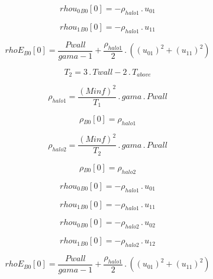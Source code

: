 \documentclass{article}
\begin{document}
\begin{dmath}{rhou_{0}{_{B0}}}[{0}] = - \rho_{halo 1} \,.\, u_{01}\end{dmath}

\begin{dmath}{rhou_{1}{_{B0}}}[{0}] = - \rho_{halo 1} \,.\, u_{11}\end{dmath}

\begin{dmath}{rhoE{_{B0}}}[{0}] = \frac{Pwall}{gama - 1} + \frac{\rho_{halo 1}}{2} \,.\, \left(\left(u_{01} \right)^{2} + \left(u_{11} \right)^{2}\right)\end{dmath}

\begin{dmath}T_{2} = 3 \,.\, Twall - 2 \,.\, T_{above}\end{dmath}

\begin{dmath}\rho_{halo 1} = \frac{\left(Minf \right)^{2}}{T_{1}} \,.\, gama \,.\, Pwall\end{dmath}

\begin{dmath}{\rho{_{B0}}}[{0}] = \rho_{halo 1}\end{dmath}

\begin{dmath}\rho_{halo 2} = \frac{\left(Minf \right)^{2}}{T_{2}} \,.\, gama \,.\, Pwall\end{dmath}

\begin{dmath}{\rho{_{B0}}}[{0}] = \rho_{halo 2}\end{dmath}

\begin{dmath}{rhou_{0}{_{B0}}}[{0}] = - \rho_{halo 1} \,.\, u_{01}\end{dmath}

\begin{dmath}{rhou_{1}{_{B0}}}[{0}] = - \rho_{halo 1} \,.\, u_{11}\end{dmath}

\begin{dmath}{rhou_{0}{_{B0}}}[{0}] = - \rho_{halo 2} \,.\, u_{02}\end{dmath}

\begin{dmath}{rhou_{1}{_{B0}}}[{0}] = - \rho_{halo 2} \,.\, u_{12}\end{dmath}

\begin{dmath}{rhoE{_{B0}}}[{0}] = \frac{Pwall}{gama - 1} + \frac{\rho_{halo 1}}{2} \,.\, \left(\left(u_{01} \right)^{2} + \left(u_{11} \right)^{2}\right)\end{dmath}
\end{document}
